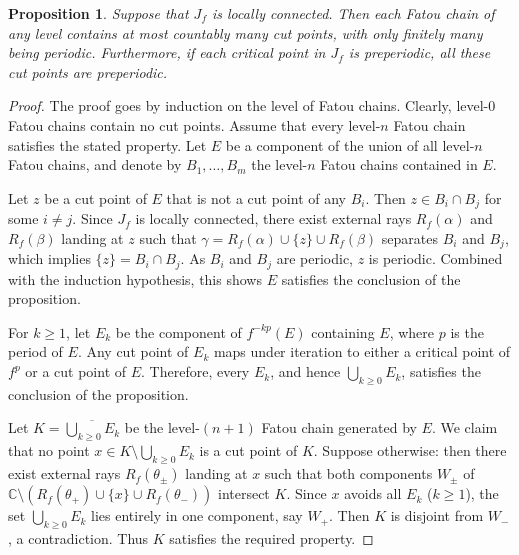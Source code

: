 \documentclass[a4paper,reqno,times, 11pt]{amsart}
\newtheorem{proposition}[theorem]{Proposition}
\theoremstyle{remark}
\theoremstyle{plain}
\numberwithin{equation}{section}
\begin{document}
	\begin{proposition}\label{pro:cut-point}
		Suppose that $J_f$ is locally connected. Then
		each Fatou chain of any level contains at most countably many cut points, with only finitely many being periodic. Furthermore, if each critical point in $J_f$ is preperiodic,  all these cut points are preperiodic.
	\end{proposition}
	\begin{proof}
		The proof goes by induction on the level of Fatou chains.
		Clearly, level-$0$ Fatou chains contain no cut points. Assume that every level-$n$ Fatou chain satisfies the stated property. Let $E$ be a component of the union of all  level-$n$ Fatou chains, and denote by $B_1,\ldots,B_m$ the level-$n$ Fatou chains contained in $E$.
		
		Let $z$ be a cut point of $E$ that is not a cut point of any $B_i$. Then $z \in B_i \cap B_j$ for some $i \neq j$. Since $J_f$ is locally connected, there exist external rays $R_f(\alpha)$ and $R_f(\beta)$ landing at $z$ such that $\gamma = R_f(\alpha) \cup \{z\} \cup R_f(\beta)$ separates $B_i$ and $B_j$, which implies $\{z\} = B_i \cap B_j$. As $B_i$ and $B_j$ are periodic, $z$ is periodic. Combined with the induction hypothesis, this shows $E$ satisfies the  conclusion of the proposition.
		
		For $k \geq 1$, let $E_k$ be the component of $f^{-kp}(E)$ containing $E$, where $p$ is the period of $E$. Any cut point of $E_k$ maps under iteration to either a critical point of $f^p$ or a cut point of $E$. Therefore, every $E_k$, and hence $\bigcup_{k \geq 0} E_k$, satisfies the  conclusion of the proposition.
		
		Let $K = \overline{\bigcup_{k \geq 0} E_k}$ be the level-$(n+1)$ Fatou chain generated by $E$. We claim that no point $x \in K \setminus \bigcup_{k \geq 0} E_k$ is a cut point of $K$. Suppose otherwise: then there exist external rays $R_f(\theta_\pm)$ landing at $x$ such that both components $W_\pm$ of $\mathbb{C} \setminus (R_f(\theta_+) \cup \{x\} \cup R_f(\theta_-))$ intersect $K$. Since $x$ avoids all $E_k$ ($k \geq 1$), the set $\bigcup_{k \geq 0} E_k$ lies entirely in one component, say $W_+$. Then $K $ is disjoint from $W_-$, a contradiction. Thus $K$ satisfies the required property.  \end{proof}
	
	
\end{document}
